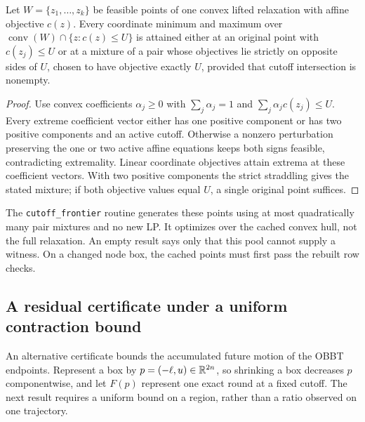\begin{proposition}\label{prop:frontier}
Let $W=\{z_1,\ldots,z_k\}$ be feasible points of one convex lifted
relaxation with affine objective $c(z)$. Every coordinate minimum and
maximum over
$\operatorname{conv}(W)\cap\{z:c(z)\le U\}$ is attained either at
an original point with $c(z_j)\le U$ or at a mixture of a pair whose
objectives lie strictly on opposite sides of $U$, chosen to have
objective exactly $U$, provided that cutoff intersection is nonempty.
\end{proposition}
\begin{proof}
Use convex coefficients $\alpha_j\ge0$ with
$\sum_j\alpha_j=1$ and $\sum_j\alpha_jc(z_j)\le U$.
Every extreme coefficient vector either has one positive component or
has two positive components and an active cutoff. Otherwise a nonzero
perturbation preserving the one or two active affine equations keeps
both signs feasible, contradicting extremality. Linear coordinate
objectives attain extrema at these coefficient vectors. With two
positive components the strict straddling gives the stated mixture;
if both objective values equal $U$, a single original point suffices.
\end{proof}

The \texttt{cutoff\_frontier} routine generates these points using at
most quadratically many pair mixtures and no new LP. It optimizes over
the cached convex hull, not the full relaxation. An empty result says
only that this pool cannot supply a witness. On a changed node box,
the cached points must first pass the rebuilt row checks.

\subsection{A residual certificate under a uniform contraction bound}

An alternative certificate bounds the accumulated future motion of the
OBBT endpoints. Represent a box by $p=(-\ell,u)\in\mathbb R^{2n}$, so shrinking
a box decreases $p$ componentwise, and let $F(p)$ represent one exact
round at a fixed cutoff. The next result requires a uniform bound on a
region, rather than a ratio observed on one trajectory.

